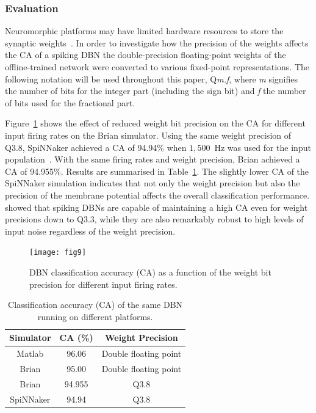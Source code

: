 \documentclass{frontiersENG} %
\begin{document}
\subsubsection{Evaluation}
Neuromorphic platforms may have limited hardware resources to store the synaptic weights~\citep{schemmel2010wafer,merolla2014million}. In order to investigate how the precision of the weights affects the CA of a spiking DBN the double-precision floating-point weights of the offline-trained network were converted to various fixed-point representations. The following notation will be used throughout this paper, Q\textit{m.f}, where \textit{m} signifies the number of bits for the integer part (including the sign bit) and \textit{f} the number of bits used for the fractional part.

Figure~\ref{Fig:brianCAfiringrate} shows the effect of reduced weight bit precision on the CA for different input firing rates on the Brian simulator.
Using the same weight precision of Q3.8, SpiNNaker achieved a CA of 94.94\% when $1,500$~Hz was used for the input population~\citep{Stromatias2015scalable}. With the same firing rates and weight precision, Brian achieved a CA of 94.955\%. Results are summarised in Table~\ref{tab:casimulators}.
The slightly lower CA of the SpiNNaker simulation indicates that not only the weight precision but also the precision of the membrane potential affects the overall classification performance.    
\citet{stromatias2015robustness} showed that spiking DBNs are capable of maintaining a high CA even for weight precisions down to Q3.3, while they are also remarkably robust to high levels of input noise regardless of the weight precision. 

\begin{figure}[hbt!]
	\centering
	\texttt{[image: fig9]}
	\caption{DBN classification accuracy (CA) as a function of the weight bit precision for different input firing rates.}
	\label{Fig:brianCAfiringrate}
\end{figure} 


\begin{table}[h]
	\caption{Classification accuracy (CA) of the same DBN running on different platforms.}
	\begin{center}
    \bgroup
    \def\arraystretch{1.4}
		\begin{tabular} {c c c}
			Simulator & CA (\%) & Weight Precision \\
			\hline
			Matlab & 96.06 & Double floating point\\
			Brian & 95.00 & Double floating point\\
			Brian & 94.955 & Q3.8\\
			SpiNNaker & 94.94 & Q3.8\\
		\end{tabular}
    \egroup
		\label{tab:casimulators}
	\end{center}
\end{table}
\end{document}
